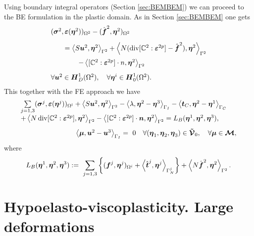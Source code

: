 \documentclass[12pt,a4paper]{scrbook}
\begin{document}
Using boundary integral operators (Section \ref{sec:BEMBEM})  we can proceed to the BE formulation in the plastic domain. As in Section \ref{sec:BEMBEM} one gets
\begin{equation*}
\begin{array}{l}
(\mbox{\boldmath$\sigma$}^2,\mbox{\boldmath$\varepsilon$}(\mbox{\boldmath$\eta$}^2))_{\Omega^2} 
- (\hat{\mbox{\boldmath$f$}}^{2}, \mbox{\boldmath$\eta$}^2)_{\Omega^2}\\[2ex]
\qquad = \left\langle S \mbox{\boldmath$u$}^2, \mbox{\boldmath$\eta$}^2 \right\rangle_{\Gamma^2} 
+ \left\langle N (\mathop{\rm div}\nolimits [{\mathbb C}^{2} : \mbox{\boldmath$\varepsilon$}^{2p}] - \hat{\mbox{\boldmath$f$}}^{2}) , \mbox{\boldmath$\eta$}^2 \right\rangle_{\Gamma^2} \\[2ex]
\qquad \qquad 
- \left\langle [{\mathbb C}^{2} : \mbox{\boldmath$\varepsilon$}^{2p}] \cdot n, \mbox{\boldmath$\eta$}^2\right\rangle_{\Gamma^2} \\[2ex]
\forall \mbox{\boldmath$u$}^2 \in \mbox{\boldmath$H$}^1_D(\Omega^2), \quad \forall \mbox{\boldmath$\eta$}^i \in \mbox{\boldmath$H$}^1_0(\Omega^2).
\end{array}
\end{equation*}
This together with the FE approach  we have
\begin{equation}\label{pr:LM:FEMBEM}
\begin{array}{l}
\sum \limits_{j=1,3} 
   (\mbox{\boldmath$\sigma$}^j,\mbox{\boldmath$\varepsilon$}(\mbox{\boldmath$\eta$}^j))_{\Omega^l}
+ \left\langle S \mbox{\boldmath$u$}^2, \mbox{\boldmath$\eta$}^2 \right\rangle_{\Gamma^2}
 - \left\langle \lambda, \mbox{\boldmath$\eta$}^2 - \mbox{\boldmath$\eta$}^3 \right\rangle_{\Gamma_I} 
 - \left\langle \mbox{\boldmath$t$}_C, \mbox{\boldmath$\eta$}^2 - \mbox{\boldmath$\eta$}^1 \right\rangle_{\Gamma_C}  \\[2ex]
+ \left\langle N \mathop{\rm div}\nolimits [{\mathbb C}^{2} : \mbox{\boldmath$\varepsilon$}^{2p}] , \mbox{\boldmath$\eta$}^2 \right\rangle_{\Gamma^2}
- \left\langle [{\mathbb C}^{2} : \mbox{\boldmath$\varepsilon$}^{2p}] \cdot \mbox{\boldmath$n$}, \mbox{\boldmath$\eta$}^2\right\rangle_{\Gamma^2}
= L_B(\mbox{\boldmath$\eta$}^1, \mbox{\boldmath$\eta$}^2, \mbox{\boldmath$\eta$}^3),  \\[2ex]
\qquad \qquad \qquad \qquad  \left\langle \mbox{\boldmath$\mu$}, \mbox{\boldmath$u$}^2 - \mbox{\boldmath$u$}^3 \right\rangle_{\Gamma_I} 
 =\,\, 0   \quad 
 \forall (\mbox{\boldmath$\eta$}_1,\mbox{\boldmath$\eta$}_2,\mbox{\boldmath$\eta$}_3) \in \mbox{\boldmath$\tilde {\mathcal V}$}_0, \quad \forall \mbox{\boldmath$\mu$} \in \mbox{\boldmath$\mathcal{M}$},
\end{array}
\end{equation}
where
\[
L_B(\mbox{\boldmath$\eta$}^1, \mbox{\boldmath$\eta$}^2, \mbox{\boldmath$\eta$}^3):=\,\, \sum_{j=1,3} \left\lbrace 
 (\mbox{\boldmath$f$}^j, \mbox{\boldmath$\eta$}^j)_{\Omega^i} 
+ \left\langle \hat{\mbox{\boldmath$t$}}^j, \mbox{\boldmath$\eta$}^j \right\rangle_{\Gamma_N^j} \right\rbrace 
+ \left\langle N \hat{\mbox{\boldmath$f$}}^{2} , \mbox{\boldmath$\eta$}^2 \right\rangle_{\Gamma^2}.
\]

\chapter{Hypoelasto-viscoplasticity. Large deformations}\label{chap:HypoelastoViscoplasticity}
\def \benchmarkTensileTest{/home/gein/Documents/tex/papers/paper_A.boundary.element.method.for.viscoplasticity/benchmark}
\end{document}
